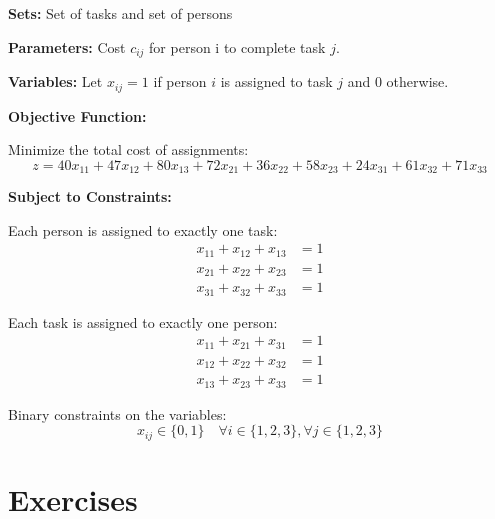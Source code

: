 \begin{solution}

\textbf{Sets:} Set of tasks and set of persons

\textbf{Parameters:} Cost $c_{ij}$ for person i to complete task $j$.

\textbf{Variables:} Let $x_{ij} = 1$ if person $i$ is assigned to task $j$ and 0 otherwise.

\textbf{Objective Function:}

Minimize the total cost of assignments:
\begin{equation}
    z = 40x_{11} + 47x_{12} + 80x_{13} + 72x_{21} + 36x_{22} + 58x_{23} + 24x_{31} + 61x_{32} + 71x_{33}
\end{equation}

\textbf{Subject to Constraints:}

Each person is assigned to exactly one task:
\begin{align}
    x_{11} + x_{12} + x_{13} &= 1 \\
    x_{21} + x_{22} + x_{23} &= 1 \\
    x_{31} + x_{32} + x_{33} &= 1
\end{align}

Each task is assigned to exactly one person:
\begin{align}
    x_{11} + x_{21} + x_{31} &= 1 \\
    x_{12} + x_{22} + x_{32} &= 1 \\
    x_{13} + x_{23} + x_{33} &= 1
\end{align}

Binary constraints on the variables:
\begin{equation}
    x_{ij} \in \{0, 1\} \quad \forall i \in \{1, 2, 3\}, \forall j \in \{1, 2, 3\}
\end{equation}
\end{solution}








\section{Exercises}

